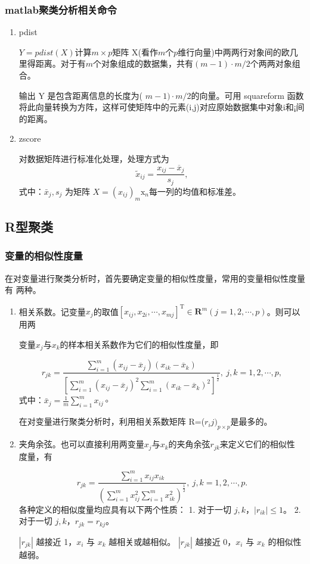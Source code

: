 \documentclass[12pt]{ctexart}
\numberwithin{equation}{section} %
\begin{document}
\subsubsection{matlab聚类分析相关命令}
\begin{enumerate}
  \item pdist

  $Y=pdist(X)$计算$m\times p$矩阵 X(看作$m$个$p$维行向量)中两两行对象间的欧几里得距离。对于有$m$个对象组成的数据集，共有$(m-1)\cdot m/2$个两两对象组合。
  
  输出 Y 是包含距离信息的长度为( $m-1)\cdot m/2$的向量。可用 squareform 函数将此向量转换为方阵，这样可使矩阵中的元素(i,j)对应原始数据集中对象i和¡间的距离。
\item zscore

对数据矩阵进行标准化处理，处理方式为
$$\widetilde{x}_{ij}=\frac{x_{ij}-\overline{x}_{j}}{s_{j}},$$
式中：$\bar{x}_j,s_j$ 为矩阵 $X=(x_{ij})_m\mathrm{x}_n$每一列的均值和标准差。

\end{enumerate}
\subsection{R型聚类}
\subsubsection{变量的相似性度量}


在对变量进行聚类分析时，首先要确定变量的相似性度量，常用的变量相似性度量有
两种。
\begin{enumerate}
\item 相关系数。记变量$x_j$的取值$[x_{ij},x_{2i},\cdots,x_{mj}]^{\mathrm{T}}\in\mathbf{R}^{m}(j=1,2,\cdots,p)$。则可以用两

变量$x_j$与$x_k$的样本相关系数作为它们的相似性度量，即

$$r_{jk}=\frac{\sum_{i=1}^{m}\left(x_{ij}-\overline{x}_{j}\right)\left(x_{ik}-\overline{x}_{k}\right)}{\left[\sum_{i=1}^{m}\left(x_{ij}-\overline{x}_{j}\right)^{2}\sum_{i=1}^{m}\left(x_{ik}-\overline{x}_{k}\right)^{2}\right]^{\frac{1}{2}}},\:j,k=1,2,\cdots,p,$$
式中：$\bar{x}_j=\frac1m\sum_{i=1}^mx_{ij}\circ$

在对变量进行聚类分析时，利用相关系数矩阵 R=($r_ij)_{p\times p}$是最多的。
\item  夹角余弦。也可以直接利用两变量$x_j$与$x_k$的夹角余弦$r_{jk}$来定义它们的相似性
度量，有

$$r_{jk}=\frac{\sum_{i=1}^{m}x_{ij}x_{ik}}{\left(\sum_{i=1}^{m}x_{ij}^{2}\sum_{i=1}^{m}x_{ik}^{2}\right)^{\frac{1}{2}}},\:j,k=1,2,\cdots,p.$$
各种定义的相似度量均应具有以下两个性质：
1. 对于一切 \( j, k \)，\(|r_{ik}| \leq 1\)。
2. 对于一切 \( j, k \)，\( r_{jk} = r_{kj} \)。

\(|r_{jk}|\) 越接近 1，\( x_i \) 与 \( x_k \) 越相关或越相似。 \(|r_{jk}|\) 越接近 0，\( x_i \) 与 \( x_k \) 的相似性越弱。
\end{enumerate}
\end{document}
